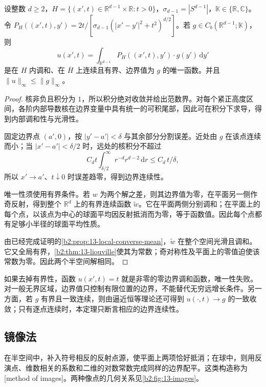 \begin{theorem}\label{b2:thm:13-halfspace-dirichlet}
设整数 \(d\geq2\)，\(H=\{(x',t)\in\mathbb R^{d-1}\times\mathbb R:t>0\}\)，\(\sigma_{d-1}=|S^{d-1}|\)，\(\mathbb K\in\{\mathbb R,\mathbb C\}\)。令 \(P_H((x',t),y')=2t/[\sigma_{d-1}(|x'-y'|^2+t^2)^{d/2}]\)。若 \(g\in C_b(\mathbb R^{d-1};\mathbb K)\)，则
\[
 u(x',t)=\int_{\mathbb R^{d-1}}P_H((x',t),y')\cdot g(y')\,\mathrm{d}y'
\]
是在 \(H\) 内调和、在 \(\overline H\) 上连续且有界、边界值为 \(g\) 的唯一函数。并且 \(\|u\|_\infty\leq\|g\|_\infty\)。
\end{theorem}
\begin{proof}
核非负且积分为 \(1\)，所以积分绝对收敛并给出范数界。对每个紧正高度区间，各阶内部导数核在边界变量中具有统一的可积尾部，因此可在积分下求导，得到内部调和性与光滑性。

固定边界点 \((a',0)\)，按 \(|y'-a'|<\delta\) 与其余部分分割误差。近处由 \(g\) 在该点连续而小；当 \(|x'-a'|<\delta/2\) 时，远处的核积分不超过
\[
 C_d t\int_{\delta/2}^\infty r^{-d}r^{d-2}\,\mathrm{d}r
 \leq C_d\,t/\delta,
\]
所以 \(x'\to a'\)、\(t\downarrow0\) 时误差趋零，得到边界连续性。

唯一性须使用有界条件。若 \(w\) 为两个解之差，则其边界值为零，在平面另一侧作奇反射，得到整个 \(\mathbb R^d\) 上的有界连续函数 \(\widetilde w\)。它在平面两侧分别调和；在平面上的每个点，以该点为中心的球面平均因反射抵消而为零，等于函数值。因此每个点都有足够小半径的球面平均性质。

由已经完成证明的\cref{b2:prop:13-local-converse-mean}，\(\widetilde w\) 在整个空间光滑且调和。它又全局有界，\cref{b2:thm:13-liouville}使其为常数；奇对称性及平面上的零值迫使该常数为零。因此两个半空间解相同。
\end{proof}

如果去掉有界性，函数 \(u(x',t)=t\) 就是非零的零边界调和函数，唯一性失败。对一般无界区域，边界值只控制有限位置的边界，不能替代无穷远增长条件。另一方面，若 \(g\) 有界且一致连续，则由逼近恒等理论还可得到 \(u(\cdot,t)\to g\) 的一致收敛；只有逐点连续时，本定理只断言相应的边界连续性。

\subsection{镜像法}
\label{b2:subsec:130404}

在半空间中，补入符号相反的反射点源，使平面上两项恰好抵消；在球中，则用反演点、维数相关的系数和二维的对数常数完成同样的边界配平。这类构造称为[method of images]。两种像点的几何关系见\cref{b2:fig:13-images}。


